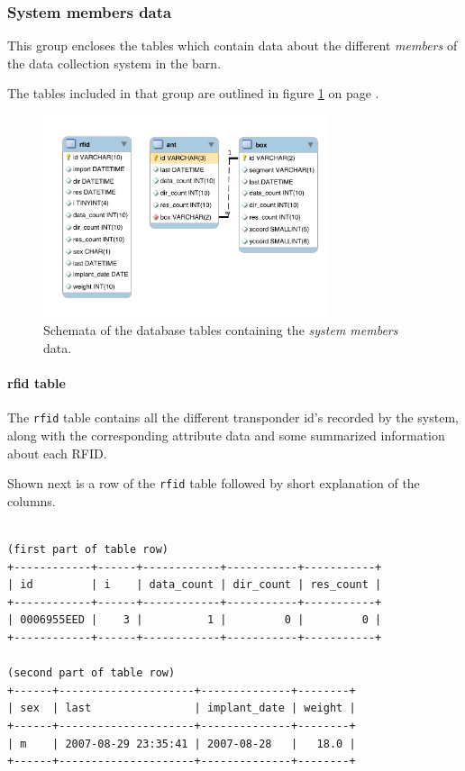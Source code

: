 \subsubsection{System members data}

This group encloses the tables which contain data about the different \textit{members} of the data collection system in the barn.

The tables included in that group are outlined in figure \ref{fig:system_members} on page \pageref{fig:system_members}. 

\begin{figure}[htpb]
\begin{center}
  \includegraphics[width=0.75\textwidth]{assets/pdf/system_members_schema.pdf}
  \caption[Schema of database tables with system member data]{Schemata of the database tables containing the \textit{system members} data.}
  \label{fig:system_members}
\end{center}
\end{figure}

\paragraph{rfid table}
\label{para:rfid_table}

The \lstinline|rfid| table contains all the different transponder id's recorded by the system, along with the corresponding attribute data and some summarized information about each \ac{RFID}. 

Shown next is a row of the \lstinline|rfid| table followed by short explanation of the columns.
\codescript
\begin{lstlisting}[frame=none]

(first part of table row)
+------------+------+------------+-----------+-----------+
| id         | i    | data_count | dir_count | res_count |
+------------+------+------------+-----------+-----------+
| 0006955EED |    3 |          1 |         0 |         0 |
+------------+------+------------+-----------+-----------+

(second part of table row)
+------+---------------------+--------------+--------+
| sex  | last                | implant_date | weight |
+------+---------------------+--------------+--------+
| m    | 2007-08-29 23:35:41 | 2007-08-28   |   18.0 |
+------+---------------------+--------------+--------+

\end{lstlisting}

